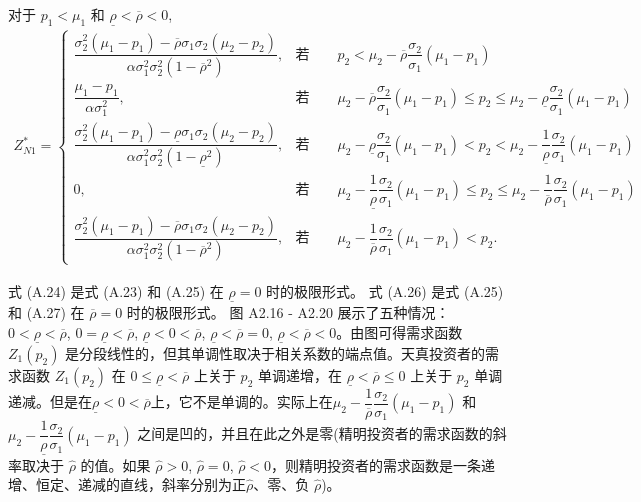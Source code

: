\documentclass[10.0pt]{article}
\begin{document}
对于 $ p_1 < \mu_1 $ 和 $ \underline{\rho} < \overline{\rho} < 0 $,
{\footnotesize \begin{eqnarray}
Z_{N 1}^* = \left\{ \begin{matrix}
\dfrac{\sigma_2^2 (\mu_1 - p_1) - \overline{\rho} \sigma_1 \sigma_2 (\mu_2 - p_2)}{\alpha \sigma_1^2 \sigma_2^2 (1 - \overline{\rho}^2)}, & \text{若} \qquad p_2 < \mu_2 - \overline{\rho} \dfrac{\sigma_2}{\sigma_1} (\mu_1 - p_1) \\
\dfrac{\mu_1 - p_1}{\alpha \sigma_1^2}, & \text{若} \qquad \mu_2 - \overline{\rho} \dfrac{\sigma_2}{\sigma_1} (\mu_1 - p_1) \leqslant p_2 \leqslant \mu_2 - \underline{\rho} \dfrac{\sigma_2}{\sigma_1} (\mu_1 - p_1) \\
\dfrac{\sigma_2^2 (\mu_1 - p_1) - \underline{\rho} \sigma_1 \sigma_2 (\mu_2 - p_2)}{\alpha \sigma_1^2 \sigma_2^2 (1 - \underline{\rho}^2)}, & \text{若} \qquad \mu_2 - \underline{\rho} \dfrac{\sigma_2}{\sigma_1} (\mu_1 - p_1) < p_2 < \mu_2 - \dfrac1{\underline{\rho}} \dfrac{\sigma_2}{\sigma_1} (\mu_1 - p_1) \\
0, & \text{若} \qquad \mu_2 - \dfrac1{\underline{\rho}} \dfrac{\sigma_2}{\sigma_1} (\mu_1 - p_1) \leqslant p_2 \leqslant \mu_2 - \dfrac1{\overline{\rho}} \dfrac{\sigma_2}{\sigma_1} (\mu_1 - p_1) \\
\dfrac{\sigma_2^2 (\mu_1 - p_1) - \overline{\rho} \sigma_1 \sigma_2 (\mu_2 - p_2)}{\alpha \sigma_1^2 \sigma_2^2 (1 - \overline{\rho}^2)}, & \text{若} \qquad \mu_2 - \dfrac1{\overline{\rho}} \dfrac{\sigma_2}{\sigma_1} (\mu_1 - p_1) < p_2.
\end{matrix} \right.
\end{eqnarray}}


式 (A.24) 是式 (A.23) 和 (A.25) 在 $ \underline{\rho} = 0 $ 时的极限形式。
式 (A.26) 是式 (A.25) 和 (A.27) 在 $ \overline{\rho} = 0 $ 时的极限形式。
图 A2.16 - A2.20 展示了五种情况：  $ 0 < \underline{\rho} < \overline{\rho} $, $ 0 = \underline{\rho} < \overline{\rho} $, $ \underline{\rho} < 0 < \overline{\rho} $, $ \underline{\rho} < \overline{\rho} = 0 $, $ \underline{\rho} < \overline{\rho} < 0 $。由图可得需求函数 $ Z_1 (p_2) $ 是分段线性的，但其单调性取决于相关系数的端点值。天真投资者的需求函数 $ Z_1 (p_2) $ 在 $ 0 \leqslant \underline{\rho} < \overline{\rho} $ 上关于 $ p_2 $ 单调递增，在  $ \underline{\rho} < \overline{\rho} \leqslant 0 $ 上关于 $ p_2 $ 单调递减。但是在$ \underline{\rho} < 0 < \overline{\rho} $上，它不是单调的。实际上在$ \mu_2 - \dfrac1{\overline{\rho}} \dfrac{\sigma_2}{\sigma_1} (\mu_1 - p_1) $ 和 $ \mu_2 - \dfrac1{\underline{\rho}} \dfrac{\sigma_2}{\sigma_1} (\mu_1 - p_1) $  之间是凹的，并且在此之外是零(精明投资者的需求函数的斜率取决于 $ \hat{\rho} $ 的值。如果 $ \hat{\rho} > 0 $, $ \hat{\rho} = 0 $, $ \hat{\rho} < 0 $，则精明投资者的需求函数是一条递增、恒定、递减的直线，斜率分别为正$ \hat{\rho} $、零、负 $ \hat{\rho} $)。
\end{document}

